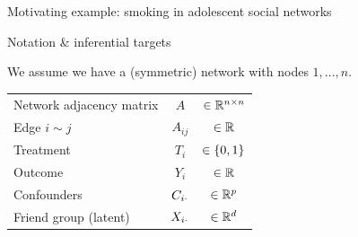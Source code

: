 \documentclass[final]{beamer}
\newlength{\colwidth}
\begin{document}
\begin{frame}[t]
\begin{columns}[t]
\begin{column}{\colwidth}
\begin{block}{Motivating example: smoking in adolescent social networks}
            \end{block}


            \begin{block}{Notation \& inferential targets}

                \begin{minipage}{.5\textwidth}

                    \centering

                    We assume we have a (symmetric) network with nodes $1, ..., n$.

                    \vspace{1cm}

                    \begin{table}[]
                        \begin{tabular}{lcc}
                            Network adjacency matrix & $A$            & $\in \mathbb{R}^{n \times n}$ \\
                            Edge $i \sim j$          & $A_{ij}$       & $\in \mathbb{R}$              \\
                            Treatment                & $T_i$          & $\in \{0, 1\} $     \\
                            Outcome                  & $Y_i$          & $\in \mathbb{R}$              \\
                            Confounders              & $C_{i \cdot}$ & $\in \mathbb{R}^p$            \\
                            Friend group (latent)    & $X_{i \cdot}$ & $\in \mathbb{R}^d$
                        \end{tabular}
                    \end{table}

                \end{minipage}
                \begin{minipage}{.5\textwidth}


\end{minipage}
\end{block}
\end{column}
\end{columns}
\end{frame}
\end{document}
